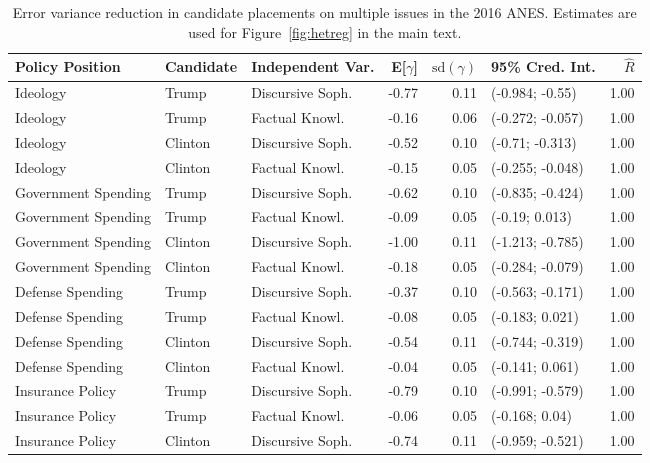 \begin{table}[ht]
\centering
\caption[Error variance reduction in candidate placements on multiple issues in the 2016 ANES]{Error variance reduction in candidate placements on multiple issues in the 2016 ANES.
         Estimates are used for Figure~\ref{fig:hetreg} in the main text.} 
\label{app:hetreg2016}
\begin{tabular}{lllrrlr}
  \hline
Policy Position & Candidate & Independent Var. & E[$\gamma$] & $\text{sd}(\gamma)$ & 95\% Cred. Int. & $\hat{R}$ \\ 
  \hline
Ideology & Trump & Discursive Soph. & -0.77 & 0.11 & (-0.984; -0.55) & 1.00 \\ 
  Ideology & Trump & Factual Knowl. & -0.16 & 0.06 & (-0.272; -0.057) & 1.00 \\ 
  Ideology & Clinton & Discursive Soph. & -0.52 & 0.10 & (-0.71; -0.313) & 1.00 \\ 
  Ideology & Clinton & Factual Knowl. & -0.15 & 0.05 & (-0.255; -0.048) & 1.00 \\ 
  Government Spending & Trump & Discursive Soph. & -0.62 & 0.10 & (-0.835; -0.424) & 1.00 \\ 
  Government Spending & Trump & Factual Knowl. & -0.09 & 0.05 & (-0.19; 0.013) & 1.00 \\ 
  Government Spending & Clinton & Discursive Soph. & -1.00 & 0.11 & (-1.213; -0.785) & 1.00 \\ 
  Government Spending & Clinton & Factual Knowl. & -0.18 & 0.05 & (-0.284; -0.079) & 1.00 \\ 
  Defense Spending & Trump & Discursive Soph. & -0.37 & 0.10 & (-0.563; -0.171) & 1.00 \\ 
  Defense Spending & Trump & Factual Knowl. & -0.08 & 0.05 & (-0.183; 0.021) & 1.00 \\ 
  Defense Spending & Clinton & Discursive Soph. & -0.54 & 0.11 & (-0.744; -0.319) & 1.00 \\ 
  Defense Spending & Clinton & Factual Knowl. & -0.04 & 0.05 & (-0.141; 0.061) & 1.00 \\ 
  Insurance Policy & Trump & Discursive Soph. & -0.79 & 0.10 & (-0.991; -0.579) & 1.00 \\ 
  Insurance Policy & Trump & Factual Knowl. & -0.06 & 0.05 & (-0.168; 0.04) & 1.00 \\ 
  Insurance Policy & Clinton & Discursive Soph. & -0.74 & 0.11 & (-0.959; -0.521) & 1.00 \\ 

\end{tabular}
\end{table}
